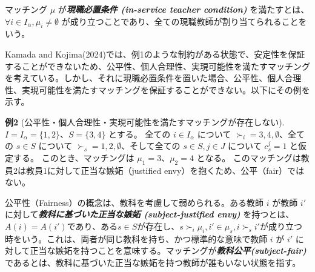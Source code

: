 \documentclass[12pt, a4paper]{article}
\theoremstyle{definition}
\newtheorem{defn}{定義}
\theoremstyle{remark}
\theoremstyle{plain}
\begin{document}
マッチング $\mu$ が\textbf{\textit{現職必置条件 (in-service teacher condition) }}を満たすとは、$\forall i \in I_{\alpha}, \mu_i \neq \emptyset$ が成り立つことであり、全ての現職教師が割り当てられることをいう。


Kamada and Kojima(2024)では、例1のような制約がある状態で、安定性を保証することができないため、公平性、個人合理性、実現可能性を満たすマッチングを考えている。しかし、それに現職必置条件を置いた場合、公平性、個人合理性、実現可能性を満たすマッチングを保証することができない。以下にその例を示す。

\textbf{例2} (公平性・個人合理性・実現可能性を満たすマッチングが存在しない). 
$I = I_\alpha = \{1, 2\}$、$S = \{3, 4\}$ とする。
全ての $i \in I_\alpha$ について $\succ_i = 3, 4, \emptyset$、全ての $s \in S$ について $\succ_s = 1, 2, \emptyset$、そして全ての $s \in S, j \in J$ について $c_s^j = 1$ と仮定する。
このとき、マッチングは $\mu_1 = 3$、$\mu_2 = 4$ となる。
このマッチングは教員2は教員1に対して正当な嫉妬（justified envy）を抱くため、公平（fair）ではない。






公平性（Fairness）の概念は、教科を考慮して弱められる。ある教師 $i$ が教師 $i'$ に対して\textbf{\textit{教科に基づいた正当な嫉妬 (subject-justified envy) }}を持つとは、$A(i) = A(i')$であり、ある$ s \in S$が存在し、$s \succ_i \mu_i, i' \in \mu_s, i \succ_s i'$が成り立つ時をいう。これは、両者が同じ教科を持ち、かつ標準的な意味で教師 $i$ が $i'$ に対して正当な嫉妬を持つことを意味する。マッチングが\textbf{\textit{教科公平(subject-fair) }} であるとは、教科に基づいた正当な嫉妬を持つ教師が誰もいない状態を指す。


  
\end{document}
